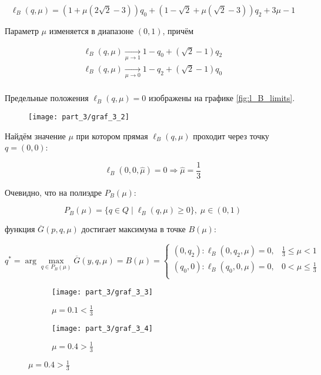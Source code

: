 \begin{flushleft}
	$$\ell_B(q, \mu) = 
	(1+\mu(2\sqrt{2}-3))q_0+
	(1-\sqrt{2}+\mu(\sqrt{2}-3))q_2
	+3\mu-1$$ 	
	
	Параметр $\mu$ изменяется в диапазоне $(0,1)$, причём	
	
	\begin{gather*}	
	\ell_B(q,\mu) \xrightarrow[\mu\rightarrow 1]{} 
	1-q_0+(\sqrt{2}-1)q_2\\	
	\ell_B(q,\mu) \xrightarrow[\mu\rightarrow 0]{} 	
	1-q_2+(\sqrt{2}-1)q_0\\
	\end{gather*}
	
	Предельные положения $\ell_B(q, \mu)=0$ изображены на графике \eqref{fig:l_B_limits}.
	
	\begin{figure}[H]
		\centering
  		\texttt{[image: part\_3/graf\_3\_2]}
  		\caption{}
  		\label{fig:l_B_limits}
	\end{figure}	
	
	Найдём значение $\mu$ при котором прямая $\ell_B(q, \mu)$ проходит через точку
	$q=(0,0)$:
	
	$$\ell_B(0,0,\hat \mu) = 0
	\Rightarrow \hat \mu = \frac{1}{3}$$	
	
	Очевидно, что на полиэдре $P_B(\mu):$
		
	$$P_B(\mu)=\{q \in Q \; | 
	\;  \ell_B(q, \mu) \geqslant 0 \}, \; \mu \in (0,1)$$
	
	функция $\overline{G}(p,q,\mu)$ достигает максимума в точке $B(\mu):$
	
	$$
	q^* = \arg \max \limits_{q\in P_B(\mu)} \overline G(y,q,\mu) = B(\mu)=
	\begin{cases}
		(0, q_2) : \ell_B(0,q_2,\mu)=0, & \frac{1}{3} \leqslant \mu < 1 \\
		(q_0, 0) : \ell_B(q_0,0,\mu)=0, & 0 < \mu \leqslant \frac{1}{3} \\
	\end{cases}	
	$$
	
	\begin{figure}[H]
    	\centering
     	\begin{subfigure}[b]{0.4 \textwidth}
        	\centering
        	\texttt{[image: part\_3/graf\_3\_3]}
        	\caption{$\mu=0.1 < \frac{1}{3}$}
         	\label{fig:y equals x}
     	\end{subfigure}
     	\hspace{10mm}
     	\begin{subfigure}[b]{0.4 \textwidth}
        	\centering
        	\texttt{[image: part\_3/graf\_3\_4]}
        	\caption{$\mu=0.4 > \frac{1}{3}$}
        	\label{fig:three sin x}
     	\end{subfigure}
	\end{figure}	


\end{flushleft}
